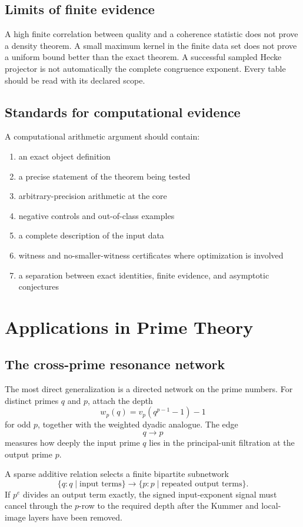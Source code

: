 \section{Limits of finite evidence}
A high finite correlation between quality and a coherence statistic does not prove a density theorem. A small maximum kernel in the finite data set does not prove a uniform bound better than the exact theorem. A successful sampled Hecke projector is not automatically the complete congruence exponent. Every table should be read with its declared scope.

\section{Standards for computational evidence}
A computational arithmetic argument should contain:
\begin{enumerate}[leftmargin=1.5em]
\item an exact object definition
\item a precise statement of the theorem being tested
\item arbitrary-precision arithmetic at the core
\item negative controls and out-of-class examples
\item a complete description of the input data
\item witness and no-smaller-witness certificates where optimization is involved
\item a separation between exact identities, finite evidence, and asymptotic conjectures
\end{enumerate}

\chapter{Applications in Prime Theory}

\section{The cross-prime resonance network}
The most direct generalization is a directed network on the prime numbers. For distinct primes $q$ and $p$, attach the depth
\[
\boxed{
w_p(q)=v_p(q^{p-1}-1)-1
}
\]
for odd $p$, together with the weighted dyadic analogue. The edge
\[
q\longrightarrow p
\]
measures how deeply the input prime $q$ lies in the principal-unit filtration at the output prime $p$.

A sparse additive relation selects a finite bipartite subnetwork
\[
\{q:q\mid\text{input terms}\}
\longrightarrow
\{p:p\mid\text{repeated output terms}\}.
\]
If $p^e$ divides an output term exactly, the signed input-exponent signal must cancel through the $p$-row to the required depth after the Kummer and local-image layers have been removed.

